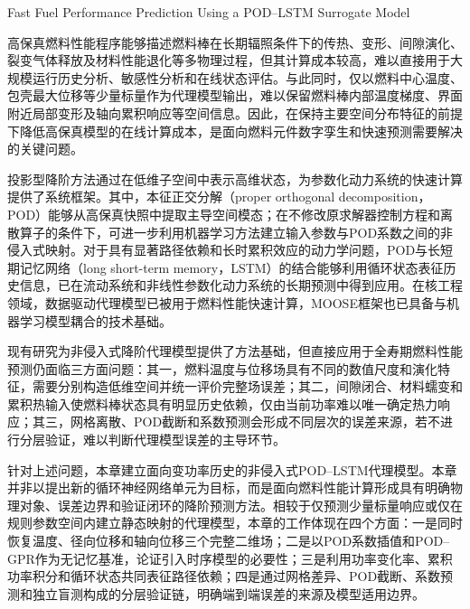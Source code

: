 
{Fast Fuel Performance Prediction Using a POD--LSTM Surrogate Model}


高保真燃料性能程序能够描述燃料棒在长期辐照条件下的传热、变形、间隙演化、裂变气体释放及材料性能退化等多物理过程，但其计算成本较高，难以直接用于大规模运行历史分析、敏感性分析和在线状态评估。与此同时，仅以燃料中心温度、包壳最大位移等少量标量作为代理模型输出，难以保留燃料棒内部温度梯度、界面附近局部变形及轴向累积响应等空间信息。因此，在保持主要空间分布特征的前提下降低高保真模型的在线计算成本，是面向燃料元件数字孪生和快速预测需要解决的关键问题。

投影型降阶方法通过在低维子空间中表示高维状态，为参数化动力系统的快速计算提供了系统框架\cite{bennerSurveyProjectionbasedModel2015}。其中，本征正交分解（proper orthogonal decomposition，POD）能够从高保真快照中提取主导空间模态；在不修改原求解器控制方程和离散算子的条件下，可进一步利用机器学习方法建立输入参数与POD系数之间的非侵入式映射\cite{hesthavenNonintrusiveReducedOrder2018,guoDatadrivenReducedOrder2019,frescaPODDLROMEnhancingDeep2022}。对于具有显著路径依赖和长时累积效应的动力学问题，POD与长短期记忆网络（long short-term memory，LSTM）的结合能够利用循环状态表征历史信息，已在流动系统和非线性参数化动力系统的长期预测中得到应用\cite{rahmanNonintrusiveReducedOrder2019,muckeReducedOrderModeling2021,fatoneLongtimePredictionNonlinear2023}。在核工程领域，数据驱动代理模型已被用于燃料性能快速计算，MOOSE框架也已具备与机器学习模型耦合的技术基础\cite{cheMachineLearningassistedSurrogate2022,germanEnablingScientificMachine2023}。

现有研究为非侵入式降阶代理模型提供了方法基础，但直接应用于全寿期燃料性能预测仍面临三方面问题：其一，燃料温度与位移场具有不同的数值尺度和演化特征，需要分别构造低维空间并统一评价完整场误差；其二，间隙闭合、材料蠕变和累积热输入使燃料棒状态具有明显历史依赖，仅由当前功率难以唯一确定热力响应；其三，网格离散、POD截断和系数预测会形成不同层次的误差来源，若不进行分层验证，难以判断代理模型误差的主导环节。

针对上述问题，本章建立面向变功率历史的非侵入式POD--LSTM代理模型。本章并非以提出新的循环神经网络单元为目标，而是面向燃料性能计算形成具有明确物理对象、误差边界和验证闭环的降阶预测方法。相较于仅预测少量标量响应或仅在规则参数空间内建立静态映射的代理模型，本章的工作体现在四个方面：一是同时恢复温度、径向位移和轴向位移三个完整二维场；二是以POD系数插值和POD--GPR作为无记忆基准，论证引入时序模型的必要性；三是利用功率变化率、累积功率积分和循环状态共同表征路径依赖；四是通过网格差异、POD截断、系数预测和独立盲测构成的分层验证链，明确端到端误差的来源及模型适用边界。

